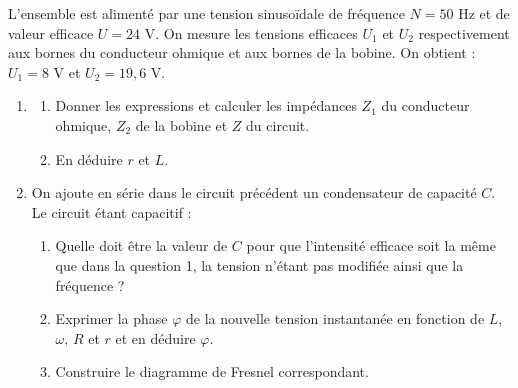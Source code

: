 \documentclass[11pt]{article}
\begin{document}
\noindent L'ensemble est alimenté par une tension sinusoïdale de fréquence $N = 50$ Hz et de valeur efficace $U = 24$ V. On mesure les tensions efficaces $U_1$ et $U_2$ respectivement aux bornes du conducteur ohmique et aux bornes de la bobine. On obtient : $U_1 = 8$ V et $U_2 = 19{,}6$ V.

\begin{enumerate}
  \item \begin{enumerate}[label=\alph*.]
    \item Donner les expressions et calculer les impédances $Z_1$ du conducteur ohmique, $Z_2$ de la bobine et $Z$ du circuit.
    \item En déduire $r$ et $L$.
  \end{enumerate}
  \item On ajoute en série dans le circuit précédent un condensateur de capacité $C$. Le circuit étant capacitif :
  \begin{enumerate}[label=\alph*.]
    \item Quelle doit être la valeur de $C$ pour que l'intensité efficace soit la même que dans la question 1, la tension n'étant pas modifiée ainsi que la fréquence ?
    \item Exprimer la phase $\varphi$ de la nouvelle tension instantanée en fonction de $L$, $\omega$, $R$ et $r$ et en déduire $\varphi$.
    \item Construire le diagramme de Fresnel correspondant.
  \end{enumerate}
\end{enumerate}
\end{document}
